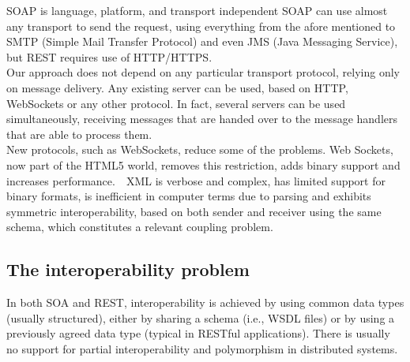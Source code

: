 SOAP is language, platform, and transport independent SOAP can use almost any transport to send the request,
using everything from the afore mentioned to SMTP (Simple Mail Transfer Protocol) and even
JMS (Java Messaging Service), but REST requires use of HTTP/HTTPS. \\
Our approach does not depend on any particular transport protocol, relying only on message delivery.
Any existing server can be used, based on HTTP, WebSockets or any other protocol. In fact, several servers can
be used simultaneously, receiving messages that are handed over to the message handlers that are able to process
them. \\
New protocols, such as WebSockets, reduce some of the problems. Web Sockets,
now part of the HTML5 world, removes this restriction, adds binary support and increases performance.  
XML is verbose and complex, has limited support for binary formats, is inefficient in computer terms due to
parsing and exhibits symmetric interoperability, based on both sender and receiver using the same schema,
which constitutes a relevant coupling problem.  \\


\subsection{The interoperability problem}
\label{section:interoperabilityProblem}

In both SOA and REST, interoperability is achieved by using common data types (usually structured),
either by sharing a schema (i.e., WSDL files) or by using a previously agreed data type
(typical in RESTful applications). There is usually no support for partial interoperability and
polymorphism in distributed systems.\\

